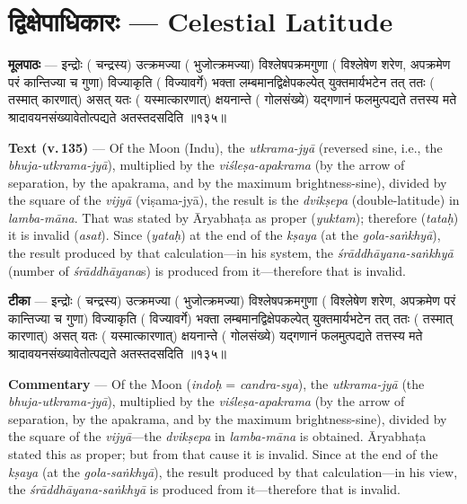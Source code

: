 \documentclass[11pt,a4paper]{article}
\newcommand{\dev}[1]{{\devanagarifont #1}}
\newcommand{\skt}[1]{{\devanagarifont\color{sktcolor} #1}}
\newenvironment{bilingual}{%
  \par\noindent
  \begin{minipage}[t]{0.47\textwidth}%
}{%
  \par\end{minipage}%
}
\newcommand{\rightcol}{%
  \par\end{minipage}%
  \hfill
  \begin{minipage}[t]{0.47\textwidth}%
}
\begin{document}
\newpage
\section[\dev{द्विक्षेपाधिकारः}]{\dev{द्विक्षेपाधिकारः} --- Celestial Latitude}

\begin{bilingual}
\textbf{मूलपाठः} --- \skt{इन्द्रोः} (\skt{चन्द्रस्य}) \skt{उत्क्रमज्या} (\skt{भुजोत्क्रमज्या}) \skt{विश्लेषपक्रमगुणा} (\skt{विश्लेषेण शरेण, अपक्रमेण परं कान्तिज्या च गुणा}) \skt{विज्याकृति} (\skt{विज्यावर्गे}) \skt{भक्ता लम्बमानद्विक्षेपकल्पेत् युक्तमार्यभटेन तत् ततः} (\skt{तस्मात् कारणात्}) \skt{असत् यतः} (\skt{यस्मात्कारणात्}) \skt{क्षयनान्ते} (\skt{गोलसंख्ये}) \skt{यद्गणानं फलमुत्पद्यते तत्तस्य मते श्रादावयनसंख्यावेतोत्पद्यते अतस्तदसदिति} ॥१३५॥
\rightcol
\textbf{Text (v.\,135)} --- Of the Moon (Indu), the \textit{utkrama-jyā} (reversed sine, i.e., the \textit{bhuja-utkrama-jyā}), multiplied by the \textit{viśleṣa-apakrama} (by the arrow of separation, by the apakrama, and by the maximum brightness-sine), divided by the square of the \textit{vijyā} (viṣama-jyā), the result is the \textit{dvikṣepa} (double-latitude) in \textit{lamba-māna}. That was stated by Āryabhaṭa as proper (\textit{yuktam}); therefore (\textit{tataḥ}) it is invalid (\textit{asat}). Since (\textit{yataḥ}) at the end of the \textit{kṣaya} (at the \textit{gola-saṅkhyā}), the result produced by that calculation---in his system, the \textit{śrāddhāyana-saṅkhyā} (number of \textit{śrāddhāyana}s) is produced from it---therefore that is invalid.
\end{bilingual}

\medskip

\begin{bilingual}
\textbf{टीका} --- \skt{इन्द्रोः} (\skt{चन्द्रस्य}) \skt{उत्क्रमज्या} (\skt{भुजोत्क्रमज्या}) \skt{विश्लेषपक्रमगुणा} (\skt{विश्लेषेण शरेण, अपक्रमेण परं कान्तिज्या च गुणा}) \skt{विज्याकृति} (\skt{विज्यावर्गे}) \skt{भक्ता लम्बमानद्विक्षेपकल्पेत् युक्तमार्यभटेन तत् ततः} (\skt{तस्मात् कारणात्}) \skt{असत् यतः} (\skt{यस्मात्कारणात्}) \skt{क्षयनान्ते} (\skt{गोलसंख्ये}) \skt{यद्गणानं फलमुत्पद्यते तत्तस्य मते श्रादावयनसंख्यावेतोत्पद्यते अतस्तदसदिति} ॥१३५॥
\rightcol
\textbf{Commentary} --- Of the Moon (\textit{indoḥ} = \textit{candra-sya}), the \textit{utkrama-jyā} (the \textit{bhuja-utkrama-jyā}), multiplied by the \textit{viśleṣa-apakrama} (by the arrow of separation, by the apakrama, and by the maximum brightness-sine), divided by the square of the \textit{vijyā}---the \textit{dvikṣepa} in \textit{lamba-māna} is obtained. Āryabhaṭa stated this as proper; but from that cause it is invalid. Since at the end of the \textit{kṣaya} (at the \textit{gola-saṅkhyā}), the result produced by that calculation---in his view, the \textit{śrāddhāyana-saṅkhyā} is produced from it---therefore that is invalid.
\end{bilingual}
\end{document}
